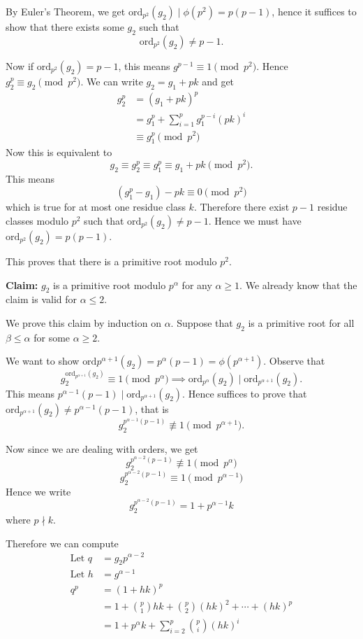 \documentclass[11pt]{article}
\theoremstyle{definition}
\newcommand{\ord}[0]{\text{ord}}
\newcommand{\Claim}[0]{\noindent\textbf{Claim: }}
\newcommand{\nl}[0]{\vspace{12pt}}
\begin{document}
	By Euler's Theorem, we get $\ord_{p^2}(g_2) \mid \phi(p^2) = p(p-1)$, hence it suffices to show that there exists some $g_2$ such that 
	$$ \ord_{p^2}(g_2) \neq p-1 .$$

	Now if $\ord_{p^2}(g_2) = p-1$, this means $g^{p-1} \equiv 1 \pmod{p^2}$. Hence $g_2^p \equiv g_2 \pmod{p^2}$. 
	We can write $g_2 = g_1 + pk$ and get
	\begin{align*}
		g_2^p &= (g_1+pk)^p \\
		&= g_1^p + \sum_{i=1}^{p} {g_1^{p-i} (pk)^i} \\
		&\equiv g_1^p \pmod{p^2}
	\end{align*}
	Now this is equivalent to
	$$ g_2 \equiv g_2^p \equiv g_1^p \equiv g_1 + pk \pmod{p^2}. $$
	This means 
	$$ (g_1^p - g_1) - pk \equiv 0 \pmod{p^2} $$
	which is true for at most one residue class $k$. 
	Therefore there exist $p-1$ residue classes modulo $p^2$ such that $\ord_{p^2}(g_2) \neq p-1$. 
	Hence we must have $\ord_{p^2}(g_2) = p(p-1)$.

	This proves that there is a primitive root modulo $p^2$. 


	\nl
	\Claim $g_2$ is a primitive root modulo $p^\alpha$ for any $\alpha \ge 1$.
	We already know that the claim is valid for $\alpha \le 2$. 

	We prove this claim by induction on $\alpha$. 
	Suppose that $g_2$ is a primitive root for all $\beta \le \alpha$ for some $\alpha \ge 2$. 

	We want to show $\ord{p^{\alpha+1}}(g_2) = p^{\alpha}(p-1) = \phi(p^{\alpha+1})$. 
	Observe that 
	$$ g_2^{\ord_{p^{\alpha+1}}(g_2)} \equiv 1 \pmod{p^\alpha} \implies \ord_{p^\alpha}(g_2) \mid \ord_{p^{\alpha+1}}(g_2). $$
	This means $p^{\alpha-1}(p-1) \mid \ord_{p^{\alpha+1}}(g_2)$. 
	Hence suffices to prove that $\ord_{p^{\alpha+1}}(g_2) \neq p^{\alpha-1}(p-1)$, that is 
	$$ g_2^{p^{\alpha-1}(p-1)} \not\equiv 1 \pmod{p^{\alpha+1}}. $$

	Now since we are dealing with orders, we get 
	$$ g_2^{p^{\alpha-2}(p-1)} \not\equiv 1 \pmod{p^\alpha} $$
	$$ g_2^{p^{\alpha-2}(p-1)} \equiv 1 \pmod{p^{\alpha-1}} $$
	Hence we write
	$$ g_2^{p^{\alpha-2}(p-1)} = 1 + p^{\alpha-1}k $$
	where $p\nmid k$. 

	Therefore we can compute 
	\begin{align*}
		\text{Let } q &= g_2{p^{\alpha-2}} \\
		\text{Let } h &= g^{\alpha-1} \\
		q^p &= (1 + hk)^p \\
		&= 1 + \binom{p}{1} hk + \binom{p}{2} (hk)^2 + \cdots + (hk)^p \\
		&= 1 + p^\alpha k + \sum_{i=2}^{p} \binom{p}{i} (hk)^i
	\end{align*}
\end{document}

